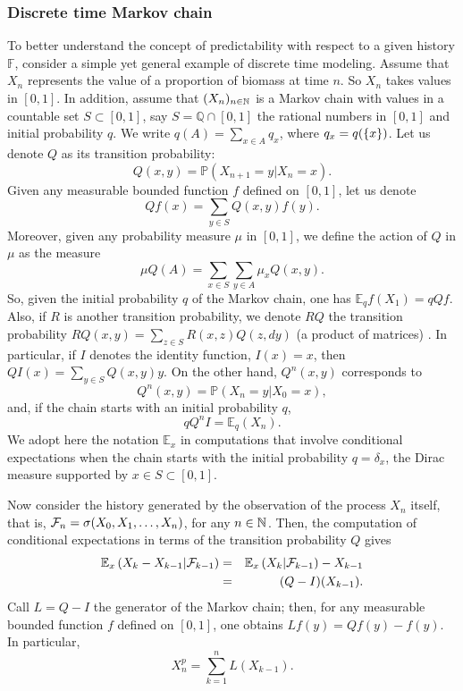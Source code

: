 \documentclass[12pt]{article}
\begin{document}
\subsubsection{Discrete time Markov chain}
To better understand the concept of predictability with respect to a given history $\mathbb{F}$, consider a simple yet general example of discrete time modeling. Assume that $X_n$ represents the value of a proportion of biomass at time $n$. So $X_n$ takes values in $[0,1]$. In addition, assume that $({X}_{n})_{n\in {\mathbb{N}}^{}}$ is a Markov chain with values in a countable set $S\subset [0,1]$, say $S=\mathbb{Q}\cap [0,1]$ the rational numbers in $[0,1]$ and initial probability $q$. We write $q(A)=\sum_{x\in A}q_x$, where $q_x=q(\left\{x\right\})$. Let us denote $Q$ as its transition probability: 
\[Q(x,y)=\mathbb{P}(X_{n+1}=y\vert X_n=x).\] 
Given any measurable bounded function $f$ defined on $[0,1]$, let us denote $$Qf(x)=\sum_{y\in S}Q(x,y)f(y).$$ Moreover, given any probability measure $\mu$ in $[0,1]$, we define the action of $Q$ in $\mu$ as the measure $$\mu Q(A)=\sum_{x\in S}\sum_{y\in A}\mu_xQ(x,y).$$ So, given the initial probability $q$ of the Markov chain, one has $\mathbb{E}_q{f(X_1)=qQf}$. Also, if $R$ is another transition probability, we denote $RQ$ the transition probability $RQ(x,y)=\sum_{z\in S}R(x,z)Q(z,dy)$ (a product of matrices) . In particular, if $I$ denotes the identity function, $I(x)=x$, then $QI(x)=\sum_{y\in S}Q(x,y)y$. On the other hand, $Q^n(x,y)$ corresponds to
\[Q^n(x,y)=\mathbb{P}(X_n=y|X_0=x),\]
and, if the chain starts with an initial probability $q$,
\[qQ^nI=\mathbb{E}_q(X_n).\]
We adopt here the notation $\mathbb{E}_x$ in computations that involve conditional expectations when the chain starts with the initial probability $q=\delta_x$, the Dirac measure supported by $x\in S\subset [0,1]$.

Now consider the history generated by the observation of the process $X_n$ itself, that is, $\mathcal{F}_n=\sigma (X_0, X_1,\ldots,X_n)$, for any  $n\in{\mathbb{N}}^{}$. Then, the computation of conditional expectations in terms of the transition probability $Q$ gives
\begin{eqnarray}
 \mathbb{E}_x\left(X_k-X_{k-1}|\mathcal{F}_{k-1}\right)&=&\mathbb{E}_x\left(X_k|\mathcal{F}_{k-1}\right)-X_{k-1}\nonumber\\
 &=&(Q-I)(X_{k-1}).
\end{eqnarray}
Call $L=Q-I$ the generator of the Markov chain; then, for any measurable bounded function $f$ defined on $[0,1]$, one obtains $Lf(y)=Qf(y)-f(y)$. In particular,
\begin{equation}
X^p_n=\sum_{k=1}^nL(X_{k-1}).
\end{equation}
\end{document}
